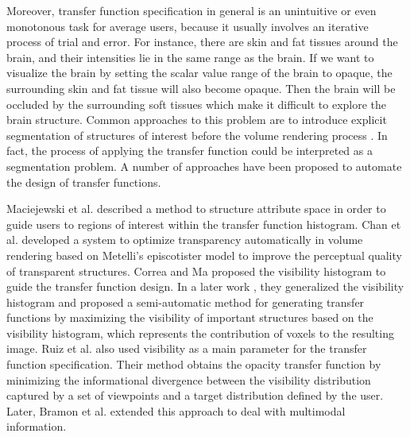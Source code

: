 \documentclass{egpubl}
\begin{document}
Moreover, transfer function specification in general is an unintuitive or even monotonous task for average users, because it usually involves an iterative process of trial and error.
For instance, there are skin and fat tissues around the brain, and their intensities lie in the same range as the brain. If we want to visualize the brain by setting the scalar value range of the brain to opaque, the surrounding skin and fat tissue will also become opaque. Then the brain will be occluded by the surrounding soft tissues which make it difficult to explore the brain structure.
Common approaches to this problem are to introduce explicit segmentation of structures of interest before the volume rendering process \cite{rezk-salama_opacity_2006}. In fact, the process of applying the transfer function could be interpreted as a segmentation problem.
A number of approaches have been proposed to automate the design of transfer functions.%

Maciejewski et al. \cite{maciejewski_structuring_2009} described a method to structure attribute space in order to guide users to regions of interest within the transfer function histogram.
Chan et al. \cite{chan_perception-based_2009} developed a system to optimize transparency automatically in volume rendering based on Metelli's episcotister model to improve the perceptual quality of transparent structures.
Correa and Ma \cite{correa_visibility-driven_2009} proposed the visibility histogram to guide the transfer function design. In a later work \cite{correa_visibility_2011}, they generalized the visibility histogram and proposed a semi-automatic method for generating transfer functions by maximizing the visibility of important structures based on the visibility histogram, which represents the contribution of voxels to the resulting image.
Ruiz et al. \cite{ruiz_automatic_2011} also used visibility as a main parameter for the transfer function specification. Their method obtains the opacity transfer function by minimizing the informational divergence between the visibility distribution captured by a set of viewpoints and a target distribution defined by the user. Later, Bramon et al. \cite{bramon_information_2013} extended this approach to deal with multimodal information.
\end{document}
